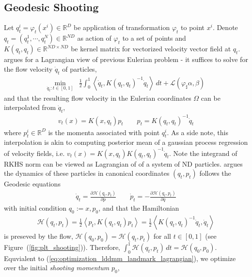 \documentclass{6838publ}
\newcommand\sH{\ensuremath{\mathcal{H}}}
\newcommand\sL{\ensuremath{\mathcal{L}}}
\newcommand\R{\ensuremath{\mathbb{R}}} %
\newcommand\inner[2]{\ensuremath{\left< #1, #2 \right>}} %
\begin{document}
\subsection{Geodesic Shooting}

Let $q_t^i = \varphi_t(x^i) \in \R^D$ be application of transformation $\varphi_t$ to point $x^i$. Denote $q_t = (q_t^1, \cdots, q_t^N) \in \R^{ND}$ as action of $\varphi_t$ to a set of points and $K(q_t,q_t) \in \R^{ND\times ND}$ be kernel matrix for vectorized velocity vector field at $q_t$. \cite{joshiLandmarkMatchingLarge2000} argues for a Lagrangian view of previous Eulerian problem - it suffices to solve for the flow velocity $\dot{q}_t$ of particles,
\begin{align}
    \min_{\dot{q}_t:t\in [0,1]}
        &\frac{1}{2} \int_0^1 \inner{\dot{q}_t}{K(q_t,q_t)^{-1}\dot{q}_t} \, dt + \sL(\varphi_\sharp \alpha, \beta)
    \label{eq:optimization_lddmm_landmark_lagrangian}
\end{align}
and that the resulting flow velocity in the Eulerian coordinates $\Omega$ can be interpolated from $\dot{q}_t$,
\begin{align}
    v_t(x)
        = K(x, q_t) p_t
    \quad\quad
    p_t
        = K(q_t, q_t)^{-1} \dot{q}_t
    \label{eq:eulerian_velocity_interpolation}
\end{align}
where $p_t^i \in \R^{D}$ is the momenta associated with point $q_t^i$. As a side note, this interpolation is akin to computing posterior mean of a gaussian process regression of velocity fields, i.e. $v_t(x) = K(x,q_t) K(q_t,q_t)^{-1} \dot{q}_t$. Note the integrand of RKHS norm can be viewed as Lagrangian of of a system of ND particles. \cite{millerGeodesicShootingComputational2006} argues the dynamics of these particles in canonical coordinates $(q_t,p_t)$ follows the Geodesic equations
\begin{align}
    \dot{q}_t
        = \frac{\partial \sH(q_t,p_t)}{\partial p}
    \quad\quad
    \dot{p}_t
        = - \frac{\partial \sH(q_t,p_t)}{\partial q}
    \label{eq:geodesic_equations}
\end{align}
with initial condition $q_0 := x, p_0$, and that the Hamiltonian 
\begin{align}
    \sH(q_t,p_t) = \frac{1}{2}\inner{p_t}{K(q_t,q_t)p_t} = \frac{1}{2}\inner{K(q_t,q_t)^{-1}\dot{q}_t}{\dot{q}_t}  
\end{align}
is preseved by the flow, $\sH(q_0,p_0)  = \sH(q_t,p_t)$ for all $t\in [0,1]$ (see Figure~(\ref{fig:plt_shooting})). Therefore, $\int_0^1 \sH(q_t,p_t) \, dt = \sH(q_0, p_0)$. Equvialent to (\ref{eq:optimization_lddmm_landmark_lagrangian}), we optimize over the initial \textit{shooting momentum} $p_0$,
\end{document}
